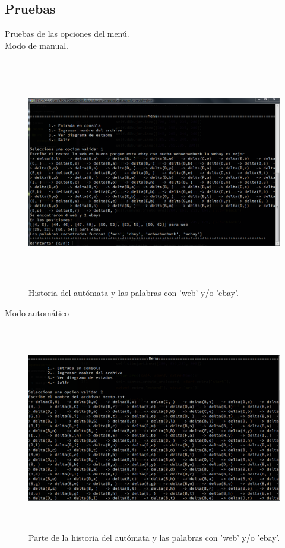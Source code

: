 	\subsection{Pruebas}
	Pruebas de las opciones del menú.
	\\
	{\large Modo de manual.}
	\begin{figure}[H]
		\begin{center}
			\includegraphics[width=\linewidth, height=10cm]{img/webay-manual.png}
			\caption{Historia del autómata y las palabras con 'web' y/o 'ebay'.}
			\label{fig:webay1}
		\end{center}
	\end{figure}
	\newpage
	{\large Modo automático}
	\begin{figure}[H]
		\begin{center}
			\includegraphics[width=\linewidth, height=9cm]{img/webay-automatico1.png}
			\caption{Parte de la historia del autómata y las palabras con 'web' y/o 'ebay'.}
			\label{fig:webay2}
		\end{center}
	\end{figure}
